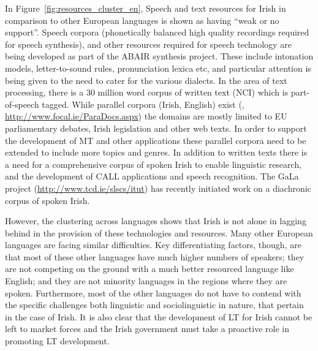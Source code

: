 \begin{multicols}{2}
In Figure~\ref{fig:resources_cluster_en}, Speech and text resources for Irish in comparison to other European languages is shown as having ``weak or no support''. Speech corpora (phonetically balanced high quality recordings required for speech synthesis), and other resources required for speech technology are being developed as part of the ABAIR synthesis  project. These include intonation models, letter-to-sound rules, pronunciation lexica etc, and particular attention is being given to the need to cater for the various dialects.  In the area of text processing, there is a 30 million word corpus of written text (NCI) which is part-of-speech tagged. While  parallel corpora (Irish, English) exist (\cite{scannell}, \url{http://www.focal.ie/ParaDocs.aspx}) the domains are mostly limited to EU parliamentary debates, Irish legislation and other web texts. In order to support the development of MT and other applications these parallel corpora need to be extended to include more topics and genres. In addition to written texts there is a need for a comprehensive corpus of spoken Irish to enable linguistic research, and the development of CALL applications and speech recognition. The GaLa project (\url{http://www.tcd.ie/slscs/itut}) has recently initiated work on a diachronic corpus of spoken Irish.

However, the clustering across languages shows that Irish is not alone in lagging behind in the provision of these technologies and resources. Many other European languages are facing similar difficulties.  Key differentiating factors, though, are that most of these other languages have much higher numbers of speakers; they are not competing on the ground with a much better resourced language like English; and they are not minority languages in the regions where they are spoken. Furthermore, most of the other languages do not have to contend with the specific challenges both linguistic and sociolinguistic in nature, that pertain in the case of Irish. It is also clear that the development of LT for Irish cannot be left to market forces and the Irish government must take a proactive role in promoting LT development.


\end{multicols}
